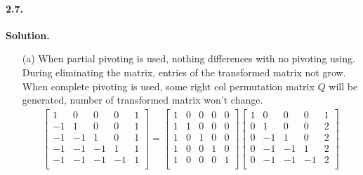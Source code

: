 \documentclass[a4paper]{book}
\newenvironment{solution}%
{\noindent\textbf{Solution.}}%
{\qedhere}
\numberwithin{equation}{chapter}
\theoremstyle{definition}
\begin{document}
\paragraph*{2.7. }
\begin{solution}
    \begin{itemize}
        \item [(a)]
              When partial pivoting is used, nothing differences with
              no pivoting using.
              During eliminating the matrix,
              entries of the transformed matrix not grow.
              When complete pivoting is used, some right col permutation
              matrix $\mathit{Q}$ will be generated, number of transformed matrix won't
              change.
              \begin{align*}
                  \left[ \begin{array}{rrrrr}
                          1  & 0  & 0  & 0  & 1 \\
                          -1 & 1  & 0  & 0  & 1 \\
                          -1 & -1 & 1  & 0  & 1 \\
                          -1 & -1 & -1 & 1  & 1 \\
                          -1 & -1 & -1 & -1 & 1 \\
                      \end{array}\right] =
                  \left[ \begin{array}{rrrrr}
                          1 & 0 & 0 & 0 & 0 \\
                          1 & 1 & 0 & 0 & 0 \\
                          1 & 0 & 1 & 0 & 0 \\
                          1 & 0 & 0 & 1 & 0 \\
                          1 & 0 & 0 & 0 & 1 \\
                      \end{array}\right]
                  \left[ \begin{array}{rrrrr}
                          1 & 0  & 0  & 0  & 1 \\
                          0 & 1  & 0  & 0  & 2 \\
                          0 & -1 & 1  & 0  & 2 \\
                          0 & -1 & -1 & 1  & 2 \\
                          0 & -1 & -1 & -1 & 2 \\
                      \end{array}\right] \\

\end{align*}
\end{itemize}
\end{solution}
\end{document}
